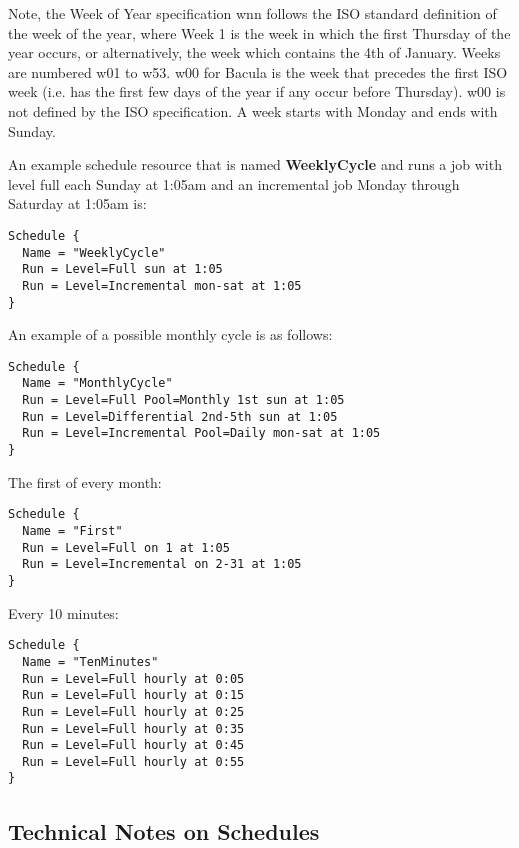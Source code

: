 Note, the Week of Year specification wnn follows the ISO standard definition
of the week of the year, where Week 1 is the week in which the first Thursday
of the year occurs, or alternatively, the week which contains the 4th of
January. Weeks are numbered w01 to w53. w00 for Bacula is the week that
precedes the first ISO week (i.e. has the first few days of the year if any
occur before Thursday). w00 is not defined by the ISO specification. A week
starts with Monday and ends with Sunday. 

An example schedule resource that is named {\bf WeeklyCycle} and runs a job
with level full each Sunday at 1:05am and an incremental job Monday through
Saturday at 1:05am is: 

\footnotesize
\begin{verbatim}
Schedule {
  Name = "WeeklyCycle"
  Run = Level=Full sun at 1:05
  Run = Level=Incremental mon-sat at 1:05
}
\end{verbatim}
\normalsize

An example of a possible monthly cycle is as follows: 

\footnotesize
\begin{verbatim}
Schedule {
  Name = "MonthlyCycle"
  Run = Level=Full Pool=Monthly 1st sun at 1:05
  Run = Level=Differential 2nd-5th sun at 1:05
  Run = Level=Incremental Pool=Daily mon-sat at 1:05
}
\end{verbatim}
\normalsize

The first of every month: 

\footnotesize
\begin{verbatim}
Schedule {
  Name = "First"
  Run = Level=Full on 1 at 1:05
  Run = Level=Incremental on 2-31 at 1:05
}
\end{verbatim}
\normalsize

Every 10 minutes: 

\footnotesize
\begin{verbatim}
Schedule {
  Name = "TenMinutes"
  Run = Level=Full hourly at 0:05
  Run = Level=Full hourly at 0:15
  Run = Level=Full hourly at 0:25
  Run = Level=Full hourly at 0:35
  Run = Level=Full hourly at 0:45
  Run = Level=Full hourly at 0:55
}
\end{verbatim}
\normalsize

\subsection*{Technical Notes on Schedules}

